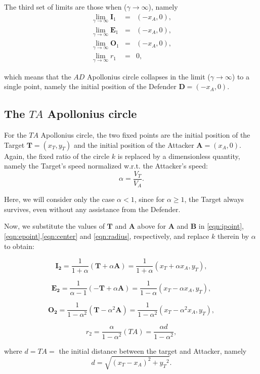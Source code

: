 The third set of limits are those when ($\gamma\to\infty$), namely
\begin{eqnarray}
\lim_{\gamma\to\infty} \boldsymbol{I}_1 &=& (-x_A,0), \\
\lim_{\gamma\to\infty} \boldsymbol{E}_1 &=& (-x_A,0),\\
\lim_{\gamma\to\infty} \boldsymbol{O}_1 &=& (-x_A,0),\\
\lim_{\gamma\to\infty} r_1 &=& 0,
\end{eqnarray}

which means that the $AD$ Apollonius circle collapses in the limit ($\gamma\to\infty$) to a single point, namely the initial position of the Defender $\boldsymbol{D}=(-x_A,0)$.

\subsection{The $TA$ Apollonius circle}
For the $TA$ Apollonius circle, the two fixed points are the initial position of the Target $\boldsymbol{T}=(x_{T},y_{T})$ and the initial position of the Attacker  $\boldsymbol{A}=(x_{A},0)$.
Again, the fixed ratio of the circle $k$ is replaced by a dimensionless quantity, namely the Target's speed normalized w.r.t. the Attacker's speed: 
\begin{equation}
\alpha= \dfrac{V_{T}}{V_{A}}.
\end{equation}

Here, we will consider only the case $\alpha <1$, since for $\alpha\geqslant1$, the Target always survives, even without any assistance from the Defender.

Now, we substitute the values of $\boldsymbol{T}$ and $\boldsymbol{A}$ above for $\boldsymbol{A}$ and $\boldsymbol{B}$ in \eqref{eqn:ipoint},\eqref{eqn:epoint},\eqref{eqn:center} and \eqref{eqn:radius}, respectively, and replace $k$ therein by $\alpha$ to obtain:

\begin{equation}
\boldsymbol{I_{2}} =\dfrac{1}{1+\alpha}(\boldsymbol{T}+\alpha \boldsymbol{A}) =\dfrac{1}{1+\alpha}(x_{T}+\alpha x_{A},y_{T}),
\end{equation}

\begin{equation}
\boldsymbol{E_{2}} =\dfrac{1}{\alpha-1}(-\boldsymbol{T}+\alpha \boldsymbol{A}) =\dfrac{1}{1-\alpha}(x_{T}-\alpha x_{A},y_{T}),
\end{equation}

\begin{equation}
\boldsymbol{O_{2}} =\dfrac{1}{1-\alpha^{2}}(\boldsymbol{T}-\alpha^{2} \boldsymbol{A}) =\dfrac{1}{1-\alpha^{2}}(x_{T}-\alpha^{2} x_{A},y_{T}),
\label{O2}
\end{equation}

\begin{equation}
r_{2} =\dfrac{\alpha}{1-\alpha^{2}}(TA)
= \dfrac{\alpha d}{1-\alpha^{2}},
\label{r2}
\end{equation}

where $d=TA=$ the initial distance between the target and Attacker, namely
\begin{equation}
d=\sqrt{(x_{T}-x_{A})^{2}+{y_{T}}^{2}}.
\label{d}
\end{equation}


\afterpage{\blankpage}